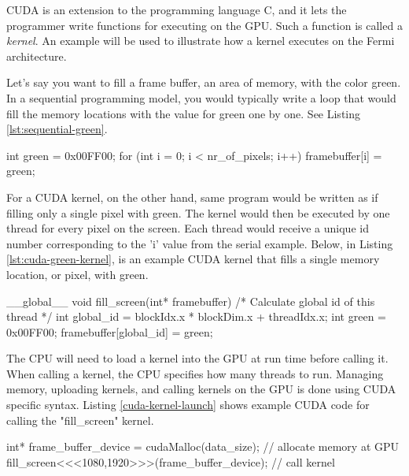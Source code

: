 \documentclass[../main/report.tex]{subfiles}
\begin{document}
CUDA is an extension to the programming language C, and it lets the programmer write functions for executing on the GPU.
Such a function is called a \emph{kernel}.
An example will be used to illustrate how a kernel executes on the Fermi architecture.

Let's say you want to fill a frame buffer, an area of memory, with the color green.
In a sequential programming model, you would typically write a loop that would fill
the memory locations with the value for green one by one.
See Listing \ref{lst:sequential-green}.

\begin{c-code}[caption=A sequential program filling the screen with green, label=lst:sequential-green]
int green = 0x00FF00;
for (int i = 0; i < nr_of_pixels; i++){
	framebuffer[i] = green;
}
\end{c-code}

For a CUDA kernel, on the other hand, same program would be written as if filling only a single pixel with green. 
The kernel would then be executed by one thread for every pixel on the screen.
Each thread would receive a unique id number corresponding to the 'i' value from the serial example.
Below, in Listing \ref{lst:cuda-green-kernel}, is an example CUDA kernel that fills a single memory location, or pixel, with green.

\begin{c-code}[caption=A CUDA kernel filling a single pixel with green, label=lst:cuda-green-kernel]
__global__ void fill_screen(int* framebuffer){
	/* Calculate global id of this thread */
	int global_id = blockIdx.x * blockDim.x + threadIdx.x; 
	int green     = 0x00FF00;
	framebuffer[global_id] = green;
}
\end{c-code}

The CPU will need to load a kernel into the GPU at run time before calling it.
When calling a kernel, the CPU specifies how many threads to run.
Managing memory, uploading kernels, and calling kernels on the GPU is done using CUDA specific syntax.
Listing \ref{cuda-kernel-launch} shows example CUDA code for calling the "fill\_screen" kernel.

\begin{c-code}[caption=Starting the CUDA kernel with one thread per pixel on a 1920x1080 screen, label=cuda-kernel-launch]
int* frame_buffer_device = cudaMalloc(data_size); // allocate memory at GPU
fill_screen<<<1080,1920>>>(frame_buffer_device); // call kernel
\end{c-code}
\end{document}
